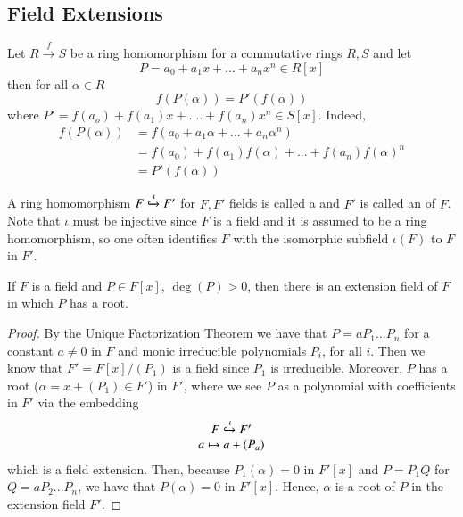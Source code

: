 \documentclass[12pt, a4paper, oneside, openright, titlepage]{book}
\begin{document}
\subsection{\textsection Field Extensions}

\begin{rmk}
        Let $R\xrightarrow{f} S$ be a ring homomorphism for a commutative rings $R,S$ and let \begin{equation}
                P = a_0+a_1x+...+a_nx^n \in R[x]
        \end{equation}
        then for all $\alpha \in R$ \begin{equation}
                f(P(\alpha)) = P'(f(\alpha))
        \end{equation}
        where $P' = f(a_o) + f(a_1)x+....+f(a_n)x^n \in S[x]$. Indeed, \begin{align*}
                f(P(\alpha)) &= f(a_0+a_1\alpha+...+a_n\alpha^n) \\
                &= f(a_0) + f(a_1)f(\alpha)+...+f(a_n)f(\alpha)^n \\
                &= P'(f(\alpha))
        \end{align*}
\end{rmk}

\begin{defn}
        A ring homomorphism $F \xhookrightarrow{\iota} F'$ for $F, F'$ fields is called a  and $F'$ is called an  of $F$. Note that $\iota$ must be injective since $F$ is a field and it is assumed to be a ring homomorphism, so one often identifies $F$ with the isomorphic subfield $\iota(F)$ to $F$ in $F'$.
\end{defn}


\begin{thm}
        If $F$ is a field and $P \in F[x]$, $\deg(P) > 0$, then there is an extension field of $F$ in which $P$ has a root.
\end{thm}
\begin{proof}
        By the Unique Factorization Theorem we have that $P = aP_1...P_n$ for a constant $a \neq 0$ in $F$ and monic irreducible polynomials $P_i$, for all $i$. Then we know that $F' = F[x]/(P_1)$ is a field since $P_1$ is irreducible. Moreover, $P$ has a root ($\alpha = x+(P_1) \in F'$) in $F'$, where we see $P$ as a polynomial with coefficients in $F'$ via the embedding \begin{equation}
                \begin{array}{c} F\xhookrightarrow{\iota}F' \\ a\mapsto a+(P_a) \end{array}
        \end{equation}
        which is a field extension. Then, because $P_1(\alpha) = 0$ in $F'[x]$ and $P = P_1Q$ for $Q = aP_2...P_n$, we have that $P(\alpha) = 0$ in $F'[x]$. Hence, $\alpha$ is a root of $P$ in the extension field $F'$.
\end{proof}
\end{document}
